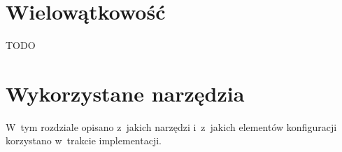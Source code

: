 \documentclass[thesis]{subfiles}
\begin{document}

\section{Wielowątkowość}

TODO


\section{Wykorzystane narzędzia}

W~tym rozdziale opisano z~jakich narzędzi i~z~jakich elementów konfiguracji korzystano w~trakcie implementacji.

%
%

%
%
\end{document}

